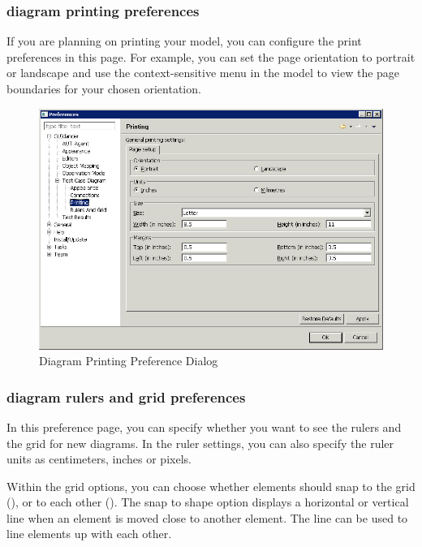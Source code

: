 \subsubsection{\gdcase{} diagram printing preferences}
If you are planning on printing your \gdcase{} model, you can configure the print preferences in this page. For example, you can set the page orientation to portrait or landscape and use the context-sensitive menu in the model to view the page boundaries for your chosen orientation. 

\begin{figure}[h]
\begin{center}
\includegraphics[width=12.5cm]{Tasks/Preferences/PS/diagramprintingprefs}
\caption{Diagram Printing Preference Dialog}
\label{diagramprintingprefs}
\end{center}
\end{figure}

\subsubsection{\gdcase{} diagram rulers and grid preferences}
In this preference page, you can specify whether you want to see the rulers and the grid for new diagrams. In the ruler settings, you can also specify the ruler units as centimeters, inches or pixels. 

Within the grid options, you can choose whether elements should snap to the grid (), or to each other (). The snap to shape option displays a horizontal or vertical line when an element is moved close to another element. The line can be used to line elements up with each other. 

